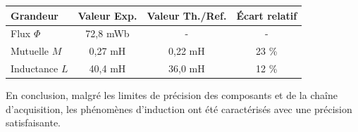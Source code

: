 \documentclass[a4paper,9pt,french]{scrartcl}
\begin{document}
\begin{center}
\begin{tabular}{|l|c|c|c|}
\hline
\textbf{Grandeur} & \textbf{Valeur Exp.} & \textbf{Valeur Th./Ref.} & \textbf{Écart relatif} \\ \hline
Flux $\Phi$ & 72,8 mWb & - & - \\ \hline
Mutuelle $M$ & 0,27 mH & 0,22 mH & 23 \% \\ \hline
Inductance $L$ & 40,4 mH & 36,0 mH & 12 \% \\ \hline
\end{tabular}
\end{center}

En conclusion, malgré les limites de précision des composants et de la chaîne d'acquisition, les phénomènes d'induction ont été caractérisés avec une précision satisfaisante.
\end{document}
